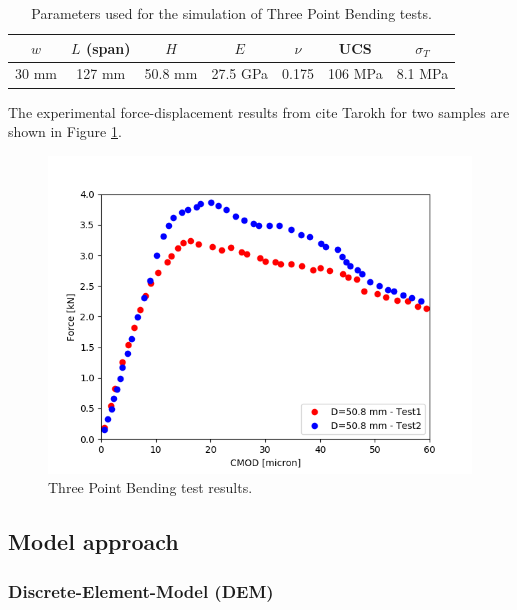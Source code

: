 \begin{table}[!ht]
\centering
\begin{tabular}{c c c |c c c c}
$w$ & $L$ (span) & $H$ & $E$ &  $\nu$ &  UCS  & $\sigma_T$  \\
\hline
30 mm & 127 mm & 50.8 mm  & 27.5 GPa & 0.175 & 106 MPa &  8.1 MPa \\
\end{tabular}
\caption{Parameters used for the simulation of Three Point Bending tests. 
\label{table:ME1_TPB_experiment}
}
\label{tabl:Numerical_param_for_sneddon_crack}
\end{table}
The experimental force-displacement results from cite Tarokh for two samples are shown in Figure \ref{fig:ME1_TPB_force_disp}.

\begin{figure}[!ht]
\centering
\includegraphics[width=1\textwidth]{figures/TPB_Force_Disp.png}
\caption{Three Point Bending test results.}
\label{fig:ME1_TPB_force_disp}
\end{figure}
\subsection{Model approach}
\subsubsection*{Discrete-Element-Model (DEM)}

